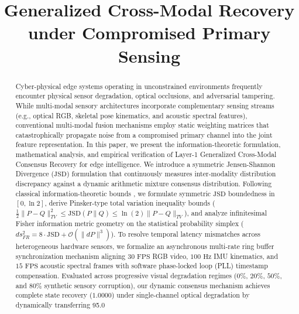 \documentclass[conference]{IEEEtran}
\begin{document}
\title{Generalized Cross-Modal Recovery under Compromised Primary Sensing}

\author{
}

\maketitle

\begin{abstract}
Cyber-physical edge systems operating in unconstrained environments frequently encounter physical sensor degradation, optical occlusions, and adversarial tampering. While multi-modal sensory architectures incorporate complementary sensing streams (e.g., optical RGB, skeletal pose kinematics, and acoustic spectral features), conventional multi-modal fusion mechanisms employ static weighting matrices that catastrophically propagate noise from a compromised primary channel into the joint feature representation. In this paper, we present the information-theoretic formulation, mathematical analysis, and empirical verification of Layer-1 Generalized Cross-Modal Consensus Recovery for edge intelligence. We introduce a symmetric Jensen-Shannon Divergence ($\mathrm{JSD}$) formulation that continuously measures inter-modality distribution discrepancy against a dynamic arithmetic mixture consensus distribution. Following classical information-theoretic bounds \cite{lin1991divergence}, we formulate symmetric $\mathrm{JSD}$ boundedness in $[0, \ln 2]$, derive Pinsker-type total variation inequality bounds ($\frac{1}{2}\|P - Q\|_{TV}^2 \le \mathrm{JSD}(P \parallel Q) \le \ln(2)\|P - Q\|_{TV}$), and analyze infinitesimal Fisher information metric geometry on the statistical probability simplex ($ds_{FR}^2 = 8 \cdot \mathrm{JSD} + \mathcal{O}(\|dP\|^3)$). To resolve temporal latency mismatches across heterogeneous hardware sensors, we formalize an asynchronous multi-rate ring buffer synchronization mechanism aligning $30\text{ FPS}$ RGB video, $100\text{ Hz}$ IMU kinematics, and $15\text{ FPS}$ acoustic spectral frames with software phase-locked loop (PLL) timestamp compensation. Evaluated across progressive visual degradation regimes ($0\%$, $20\%$, $50\%$, and $80\%$ synthetic sensory corruption), our dynamic consensus mechanism achieves complete state recovery ($1.0000$) under single-channel optical degradation by dynamically transferring 95.0%
\end{abstract}
\end{document}
